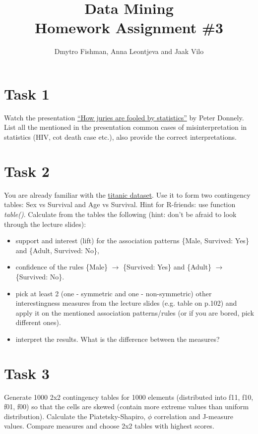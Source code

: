 \documentclass{article}
\title{Data Mining\\Homework Assignment \#3} %
\author{Dmytro Fishman, Anna Leontjeva and Jaak Vilo} %
\begin{document}
\maketitle %

\section*{Task 1}
Watch the presentation \href{http://www.ted.com/talks/peter_donnelly_shows_how_stats_fool_juries.html}{``How juries are fooled by statistics''} by Peter Donnely. List all the mentioned in the presentation common cases of misinterpretation in statistics (HIV, cot death case etc.), also provide the correct interpretations.
\section*{Task 2}
You are already familiar with the \href{https://courses.cs.ut.ee/MTAT.03.183/2014_spring/uploads/Main/titanic.txt}{titanic dataset}. Use it to form two contingency tables: Sex vs Survival and Age vs Survival. Hint for R-friends: use function \emph{table()}. Calculate from the tables the following (hint: don't be afraid to look through the lecture slides):
\begin{itemize}
\item support and interest (lift) for the association patterns \{Male, Survived: Yes\} and \{Adult, Survived: No\},
\item confidence of the rules \{Male\} $\rightarrow$ \{Survived: Yes\} and \{Adult\} $\rightarrow$ \{Survived: No\}. 
\item pick at least 2 (one - symmetric and one - non-symmetric) other interestingness measures from the lecture slides (e.g. table on p.102) and apply it on the mentioned association patterns/rules (or if you are bored, pick different ones).
\item interpret the results. What is the difference between the measures?  
\end{itemize} 

\section*{Task 3}
Generate 1000 2x2 contingency tables for 1000 elements (distributed into f11, f10, f01, f00) so that the cells are skewed (contain more extreme values than uniform distribution). Calculate the Piatetsky-Shapiro, $\phi$ correlation and J-measure values. Compare measures and choose 2x2 tables with highest scores.
\end{document}
